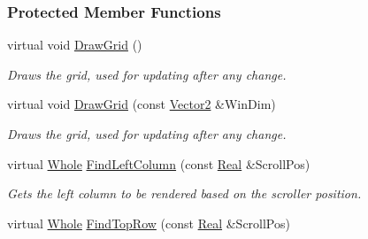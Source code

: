\subsubsection*{Protected Member Functions}
\begin{DoxyCompactItemize}
\item 
\hypertarget{classphys_1_1UI_1_1ScrolledCellGrid_aab9b6520eefbc712c9577ae0db121f13}{
virtual void \hyperlink{classphys_1_1UI_1_1ScrolledCellGrid_aab9b6520eefbc712c9577ae0db121f13}{DrawGrid} ()}
\label{classphys_1_1UI_1_1ScrolledCellGrid_aab9b6520eefbc712c9577ae0db121f13}

\begin{DoxyCompactList}\small\item\em Draws the grid, used for updating after any change. \item\end{DoxyCompactList}\item 
\hypertarget{classphys_1_1UI_1_1ScrolledCellGrid_a2931912dae2aabe0dcfd3a30f9ad8634}{
virtual void \hyperlink{classphys_1_1UI_1_1ScrolledCellGrid_a2931912dae2aabe0dcfd3a30f9ad8634}{DrawGrid} (const \hyperlink{classphys_1_1Vector2}{Vector2} \&WinDim)}
\label{classphys_1_1UI_1_1ScrolledCellGrid_a2931912dae2aabe0dcfd3a30f9ad8634}

\begin{DoxyCompactList}\small\item\em Draws the grid, used for updating after any change. \item\end{DoxyCompactList}\item 
\hypertarget{classphys_1_1UI_1_1ScrolledCellGrid_abe9fe1c56866ecc796f5b2ea8f72b853}{
virtual \hyperlink{namespacephys_a460f6bc24c8dd347b05e0366ae34f34a}{Whole} \hyperlink{classphys_1_1UI_1_1ScrolledCellGrid_abe9fe1c56866ecc796f5b2ea8f72b853}{FindLeftColumn} (const \hyperlink{namespacephys_af7eb897198d265b8e868f45240230d5f}{Real} \&ScrollPos)}
\label{classphys_1_1UI_1_1ScrolledCellGrid_abe9fe1c56866ecc796f5b2ea8f72b853}

\begin{DoxyCompactList}\small\item\em Gets the left column to be rendered based on the scroller position. \item\end{DoxyCompactList}\item 
\hypertarget{classphys_1_1UI_1_1ScrolledCellGrid_a39fd3d566131310f4a2e5713216e7ef2}{
virtual \hyperlink{namespacephys_a460f6bc24c8dd347b05e0366ae34f34a}{Whole} \hyperlink{classphys_1_1UI_1_1ScrolledCellGrid_a39fd3d566131310f4a2e5713216e7ef2}{FindTopRow} (const \hyperlink{namespacephys_af7eb897198d265b8e868f45240230d5f}{Real} \&ScrollPos)}
\label{classphys_1_1UI_1_1ScrolledCellGrid_a39fd3d566131310f4a2e5713216e7ef2}


\end{DoxyCompactItemize}
